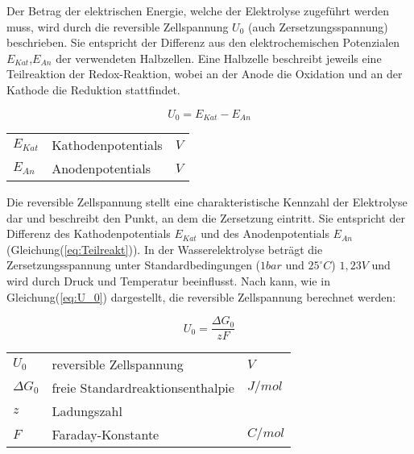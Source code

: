 \documentclass[onecolumn,10pt,titlepage]{article}
\begin{document}
Der Betrag der elektrischen Energie, welche der Elektrolyse zugeführt werden muss, wird durch die reversible Zellspannung $U_0$ (auch Zersetzungsspannung) beschrieben.\cite{Hey.26.Oktober2012} Sie entspricht der Differenz aus den elektrochemischen Potenzialen $E_{Kat}$,$E_{An}$ der verwendeten Halbzellen. Eine Halbzelle beschreibt jeweils eine Teilreaktion der Redox-Reaktion, wobei an der Anode die Oxidation und an der Kathode die Reduktion stattfindet.

\begin{equation}
	U_0 = E_{Kat} - E_{An}
	\label{eq:Teilreakt}
\end{equation}

\begin{table}[H]
	\begin{tabular*}{\textwidth}{lll}\\
		$E_{Kat}$&Kathodenpotentials&$V$\\
		$E_{An}$&Anodenpotentials&$V$\\

	\end{tabular*}
\end{table}

Die reversible Zellspannung stellt eine charakteristische Kennzahl der Elektrolyse dar und beschreibt den Punkt, an dem die Zersetzung eintritt. Sie entspricht der Differenz des Kathodenpotentials $E_{Kat}$ und des Anodenpotentials $E_{An}$ (Gleichung(\ref{eq:Teilreakt})). In der Wasserelektrolyse beträgt die Zersetzungsspannung unter Standardbedingungen ($1bar$ und $25 ^ \circ C$) $1,23V$ und wird durch Druck und Temperatur beeinflusst. Nach \cite{Kurzweil.2015} kann, wie in Gleichung(\ref{eq:U_0}) dargestellt, die reversible Zellspannung berechnet werden:

	\begin{equation}
	U_0 =  \frac{\Delta G_0}{zF}
	\label{eq:U_0}
	\end{equation}

	\begin{table}[H]
		\begin{tabular*}{\textwidth}{lll}\\
			$U_0$&reversible Zellspannung&$V$\\
			$\Delta G_0$&freie Standardreaktionsenthalpie&$J/mol$\\
			$z$&Ladungszahl&\\
			$F$&Faraday-Konstante&$C/mol$\\
		\end{tabular*}
	\end{table}
\end{document}
